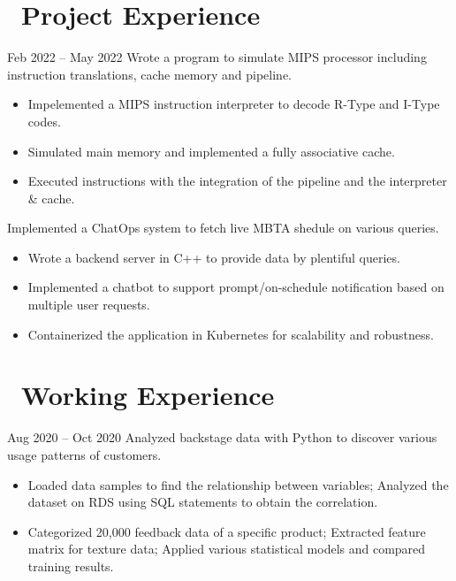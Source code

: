 \documentclass{resume}
\begin{document}
\section{\faUsers\ Project Experience}
 {Feb 2022 -- May 2022}
Wrote a program to simulate MIPS processor including instruction translations, cache memory and pipeline.
\begin{itemize}
  \item Impelemented a MIPS instruction interpreter to decode R-Type and I-Type codes.
  \item Simulated main memory and implemented a fully associative cache. 
  \item Executed instructions with the integration of the pipeline and the interpreter \& cache.  
\end{itemize}

Implemented a ChatOps system to fetch live MBTA shedule on various queries.
\begin{itemize}
  \item Wrote a backend server in C++ to provide data by plentiful queries.
  \item Implemented a chatbot to support prompt/on-schedule notification based on multiple user requests.  
  \item Containerized the application in Kubernetes for scalability and robustness. 
\end{itemize}

\section{\faUsers\ Working Experience}
 {Aug 2020 -- Oct 2020}
Analyzed backstage data with Python to discover various usage patterns of customers.
\begin{itemize}
  \item Loaded data samples to find the relationship between variables; Analyzed the dataset on RDS using SQL statements to obtain the correlation.
  \item Categorized 20,000 feedback data of a specific product; Extracted feature matrix for texture data; Applied various statistical models and compared training results.
\end{itemize}
\end{document}
